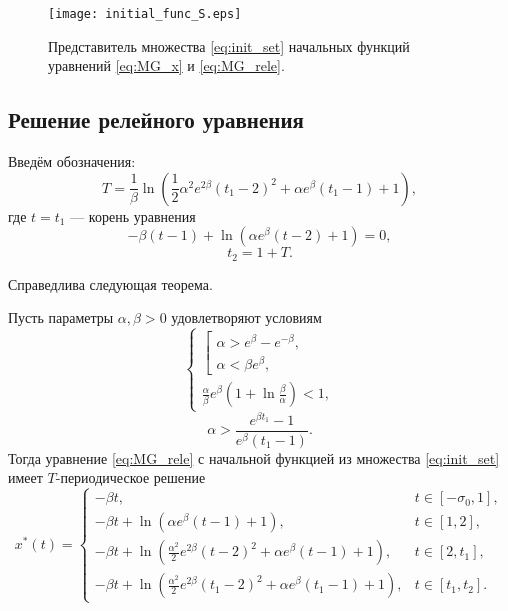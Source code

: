 \begin{figure}
	\centering
	\texttt{[image: initial\_func\_S.eps]}
	\caption{Представитель множества \eqref{eq:init_set} начальных функций уравнений \eqref{eq:MG_x} и \eqref{eq:MG_rele}.}
	\label{fig:initial_funcs:ch1}
\end{figure}

\subsection{Решение релейного уравнения}
Введём обозначения:
\begin{equation}
    \label{eq:T}
    T = \frac{1}{\beta} \ln\left(\frac{1}{2}\alpha^2e^{2\beta}(t_1 - 2)^2 + \alpha e^{\beta}(t_1 - 1) + 1\right),
\end{equation}
где $t = t_1$ --- корень уравнения 
\begin{equation}
    \label{eq:t1_cond_exp}
    -\beta(t - 1) + \ln(\alpha e^{\beta}(t - 2) + 1) = 0,
\end{equation}
\begin{equation}
    \label{eq:t2_period}
    t_2 = 1 + T.
\end{equation}

Справедлива следующая теорема.

\begin{theorem}\label{thm:relay}
Пусть параметры $\alpha, \beta>0$ удовлетворяют условиям
%
\begin{equation}
    \label{eq:cond_alpha1}
	\begin{cases}
		\left[
		\begin{array}{ll}
			\alpha > e^{\beta} - e^{-\beta},\\
			\alpha < \beta e^{\beta},
		\end{array}
		\right.\\
		\frac{\alpha}{\beta}e^{\beta}\left(1 + \ln\frac{\beta}{\alpha}\right) < 1,
	\end{cases}
\end{equation}
\begin{equation}
    \label{eq:cond_alpha2}
    \alpha > \dfrac{e^{\beta t_1} - 1}{e^{\beta}(t_1 - 1)}.
\end{equation}
%
Тогда уравнение \eqref{eq:MG_rele} с начальной функцией из множества \eqref{eq:init_set} имеет $T$-периодическое решение
\small
\begin{equation}
    \label{eq:sol_x_star}
x^*(t)= 
\begin{cases}
    -\beta t, & t\in[-\sigma_0, 1],\\
    -\beta t +\ln(\alpha e^{\beta}(t - 1)+1), & t\in[1, 2],\\
    -\beta t + \ln(\frac{\alpha^2}{2}e^{2\beta}(t - 2)^2+\alpha e^{\beta}(t - 1)+1), & t\in[2, t_1],\\
    -\beta t + \ln(\frac{\alpha^2}{2}e^{2\beta}(t_1 - 2)^2+\alpha e^{\beta}(t_1 - 1) + 1), & t\in[t_1, t_2].
\end{cases}
\end{equation}
\normalsize
\end{theorem}

